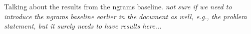 
Talking about the results from the ngrams baseline.  \emph{not sure if we need to introduce the ngrams baseline earlier in the document as well, e.g., the problem statement, but it surely needs to have results here...}

